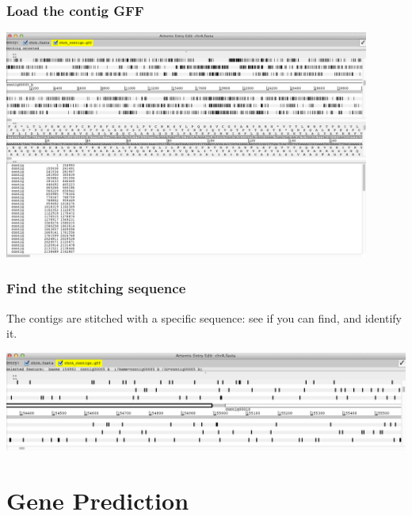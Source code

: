 \documentclass[table]{beamer}
\begin{document}
  \begin{frame}
    \frametitle{Load the contig GFF}
    \begin{center}
      \includegraphics[width=0.9\textwidth]{images/artemis_loaded_contigs} 
    \end{center}
\end{frame}

  \begin{frame}
    \frametitle{Find the stitching sequence}
    The contigs are stitched with a specific sequence: see if you can find, and identify it.
    \begin{center}
      \includegraphics[width=\textwidth]{images/artemis_stitch_tease} 
    \end{center}
\end{frame}

  \section{Gene Prediction}
\end{document}
